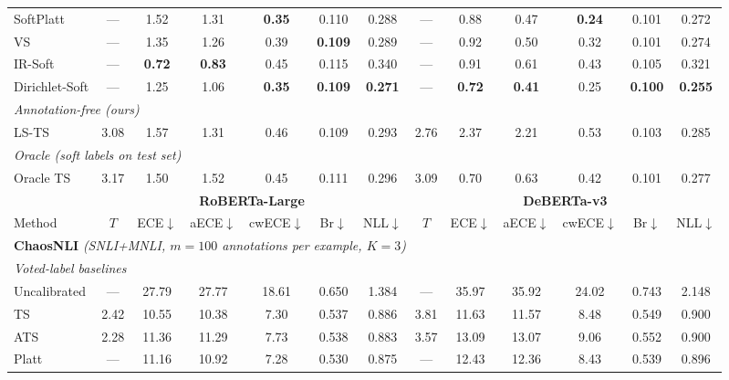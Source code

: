 \documentclass[10pt,journal,compsoc]{IEEEtran}
\begin{document}
\begin{table}[t]
{\begin{tabular}{l cccccc cccccc}
    SoftPlatt      & ---  &  1.52 &  1.31 &  \textbf{0.35} & 0.110 & 0.288  & ---  &  0.88 &  0.47 &  \textbf{0.24} & 0.101 & 0.272 \\
    VS             & ---  &  1.35 &  1.26 &  0.39 & \textbf{0.109} & 0.289  & ---  &  0.92 &  0.50 &  0.32 & 0.101 & 0.274 \\
    IR-Soft        & ---  &  \textbf{0.72} & \textbf{0.83} &  0.45 & 0.115 & 0.340  & ---  &  0.91 &  0.61 &  0.43 & 0.105 & 0.321 \\
    Dirichlet-Soft & ---  &  1.25 &  1.06 &  \textbf{0.35} & \textbf{0.109} & \textbf{0.271}  & ---  &  \textbf{0.72} & \textbf{0.41} &  0.25 & \textbf{0.100} & \textbf{0.255} \\
    \cmidrule(l){1-13}
    \multicolumn{13}{l}{\textit{Annotation-free (ours)}} \\
    LS-TS          & 3.08 &  1.57 &  1.31 &  0.46 & 0.109 & 0.293  & 2.76 &  2.37 &  2.21 &  0.53 & 0.103 & 0.285 \\
    \cmidrule(l){1-13}
    \multicolumn{13}{l}{\textit{Oracle (soft labels on test set)}} \\
    Oracle TS      & 3.17 &  1.50 &  1.52 &  0.45 & 0.111 & 0.296  & 3.09 &  0.70 &  0.63 &  0.42 & 0.101 & 0.277 \\
    \midrule
    & \multicolumn{6}{c}{\textbf{RoBERTa-Large}} & \multicolumn{6}{c}{\textbf{DeBERTa-v3}} \\
    \cmidrule(lr){2-7} \cmidrule(lr){8-13}
    Method & $T$ & ECE$\downarrow$ & aECE$\downarrow$ & cwECE$\downarrow$ & Br$\downarrow$ & NLL$\downarrow$
           & $T$ & ECE$\downarrow$ & aECE$\downarrow$ & cwECE$\downarrow$ & Br$\downarrow$ & NLL$\downarrow$ \\
    \midrule
    \multicolumn{13}{l}{\textbf{ChaosNLI} \textit{(SNLI+MNLI, $m{=}100$ annotations per example, $K{=}3$)}} \\
    \midrule
    \multicolumn{13}{l}{\textit{Voted-label baselines}} \\
    Uncalibrated   & ---  & 27.79 & 27.77 & 18.61 & 0.650 & 1.384  & ---  & 35.97 & 35.92 & 24.02 & 0.743 & 2.148 \\
    TS             & 2.42 & 10.55 & 10.38 &  7.30 & 0.537 & 0.886  & 3.81 & 11.63 & 11.57 &  8.48 & 0.549 & 0.900 \\
    ATS            & 2.28 & 11.36 & 11.29 &  7.73 & 0.538 & 0.883  & 3.57 & 13.09 & 13.07 &  9.06 & 0.552 & 0.900 \\
    Platt          & ---  & 11.16 & 10.92 &  7.28 & 0.530 & 0.875  & ---  & 12.43 & 12.36 &  8.43 & 0.539 & 0.896 \\

\end{tabular}}
\end{table}
\end{document}
